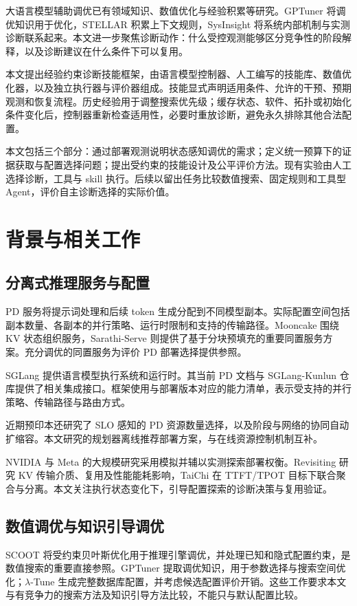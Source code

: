 \documentclass[preprint,12pt]{elsarticle}
\begin{document}
大语言模型辅助调优已有领域知识、数值优化与经验积累等研究。GPTuner 将调优知识用于优化，STELLAR 积累上下文规则，SysInsight 将系统内部机制与实测诊断联系起来\cite{gptuner2024,stellar2025,sysinsight2026}。本文进一步聚焦诊断动作：什么受控观测能够区分竞争性的阶段解释，以及诊断建议在什么条件下可以复用。

本文提出经验约束诊断技能框架，由语言模型控制器、人工编写的技能库、数值优化器，以及独立执行器与评价器组成。技能显式声明适用条件、允许的干预、预期观测和恢复流程。历史经验用于调整搜索优先级；缓存状态、软件、拓扑或初始化条件变化后，控制器重新检查适用性，必要时重放诊断，避免永久排除其他合法配置。

本文包括三个部分：通过部署观测说明状态感知调优的需求；定义统一预算下的证据获取与配置选择问题；提出受约束的技能设计及公平评价方法。现有实验由人工选择诊断，工具与 skill 执行。后续以留出任务比较数值搜索、固定规则和工具型 Agent，评价自主诊断选择的实际价值。

\section{背景与相关工作}
\subsection{分离式推理服务与配置}
PD 服务将提示词处理和后续 token 生成分配到不同模型副本。实际配置空间包括副本数量、各副本的并行策略、运行时限制和支持的传输路径。Mooncake 围绕 KV 状态组织服务，Sarathi-Serve 则提供了基于分块预填充的重要同置服务方案\cite{mooncake2024,sarathi2024}。充分调优的同置服务为评价 PD 部署选择提供参照。

SGLang 提供语言模型执行系统和运行时\cite{sglang2024}。其当前 PD 文档与 SGLang-Kunlun 仓库提供了相关集成接口\cite{sglangpd,kunlunplugin}。框架使用与部署版本对应的能力清单，表示受支持的并行策略、传输路径与路由方式。

近期预印本还研究了 SLO 感知的 PD 资源数量选择，以及阶段与网络的协同自动扩缩容\cite{pdresources2026,tokenscale2025}。本文研究的规划器离线推荐部署方案，与在线资源控制机制互补。

NVIDIA 与 Meta 的大规模研究采用模拟并辅以实测探索部署权衡\cite{pragmatic2026,metaconfig2026}。Revisiting 研究 KV 传输介质、复用及性能能耗影响，TaiChi 在 TTFT/TPOT 目标下联合聚合与分离\cite{revisiting2026,taichi2025}。本文关注执行状态变化下，引导配置探索的诊断决策与复用验证。

\subsection{数值调优与知识引导调优}
SCOOT 将受约束贝叶斯优化用于推理引擎调优，并处理已知和隐式配置约束\cite{scoot2025}，是数值搜索的重要直接参照。GPTuner 提取调优知识，用于参数选择与搜索空间优化；$\lambda$-Tune 生成完整数据库配置，并考虑候选配置评价开销\cite{gptuner2024,lambdatune2025}。这些工作要求本文与有竞争力的搜索方法及知识引导方法比较，不能只与默认配置比较。
\end{document}
